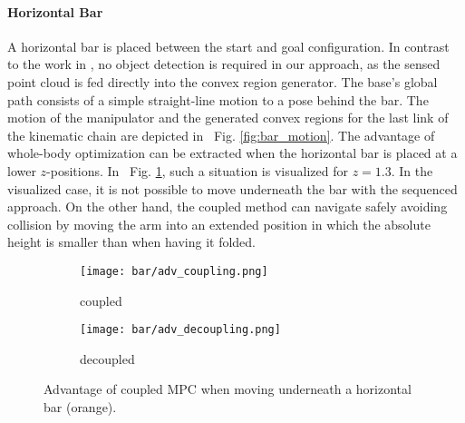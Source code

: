 \paragraph{Horizontal Bar}
\label{par:horizantal_bar}
%
A horizontal bar is placed between the start and goal configuration. In contrast to the work in \cite{Avanzini2018}, no object detection is required in our approach, as the sensed point cloud is fed directly into the convex region generator. The base's global path consists of a simple straight-line motion to a pose behind the bar. The motion of the manipulator and the generated convex regions for the last link of the kinematic chain are depicted in ~{Fig. \ref{fig:bar_motion}}. 
The advantage of whole-body optimization can be extracted when the horizontal bar is placed at a lower $z$-positions. In ~{Fig. \ref{fig:feasibility_issue}}, such a situation is visualized for $z=1.3$. In the visualized case, it is not possible to move underneath the bar with the sequenced approach. On the other hand, the coupled method can navigate safely avoiding collision by moving the arm into an extended position in which the absolute height is smaller than when having it folded.
%
\begin{figure}[h]
    \centering
    \begin{subfigure}[b]{0.45\linewidth}
        \texttt{[image: bar/adv\_coupling.png]}
        \caption{coupled}
    \end{subfigure}
    \begin{subfigure}[b]{0.425\linewidth}
        \texttt{[image: bar/adv\_decoupling.png]}
        \caption{decoupled}
    \end{subfigure}
    \caption{Advantage of coupled MPC when moving underneath a horizontal bar (orange). }
    \label{fig:feasibility_issue}
\end{figure}
%
